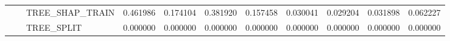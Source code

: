 \begin{table}
\begin{tabular}{lllrrrrrrrr}
 &  & TREE\_SHAP\_TRAIN & {\cellcolor[HTML]{B40426}} \color[HTML]{F1F1F1} 0.461986 & {\cellcolor[HTML]{AAC7FD}} \color[HTML]{000000} 0.174104 & {\cellcolor[HTML]{EB7D62}} \color[HTML]{F1F1F1} 0.381920 & {\cellcolor[HTML]{9DBDFF}} \color[HTML]{000000} 0.157458 & {\cellcolor[HTML]{3B4CC0}} \color[HTML]{F1F1F1} 0.030041 & {\cellcolor[HTML]{3B4CC0}} \color[HTML]{F1F1F1} 0.029204 & {\cellcolor[HTML]{3C4EC2}} \color[HTML]{F1F1F1} 0.031898 & {\cellcolor[HTML]{516DDB}} \color[HTML]{F1F1F1} 0.062227 \\
 &  & TREE\_SPLIT & {\cellcolor[HTML]{3B4CC0}} \color[HTML]{F1F1F1} 0.000000 & {\cellcolor[HTML]{3B4CC0}} \color[HTML]{F1F1F1} 0.000000 & {\cellcolor[HTML]{3B4CC0}} \color[HTML]{F1F1F1} 0.000000 & {\cellcolor[HTML]{3B4CC0}} \color[HTML]{F1F1F1} 0.000000 & {\cellcolor[HTML]{3B4CC0}} \color[HTML]{F1F1F1} 0.000000 & {\cellcolor[HTML]{3B4CC0}} \color[HTML]{F1F1F1} 0.000000 & {\cellcolor[HTML]{3B4CC0}} \color[HTML]{F1F1F1} 0.000000 & {\cellcolor[HTML]{3B4CC0}} \color[HTML]{F1F1F1} 0.000000 \\
\cline{1-11} \cline{2-11}
\bottomrule
\end{tabular}
\end{table}
